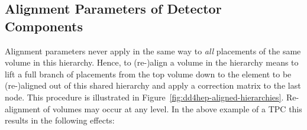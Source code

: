 \documentclass[10pt,a4paper]{article}
\begin{document}
\subsection{Alignment Parameters of Detector Components}
\label{subsect:ddalign-intro-aligments}
\noindent
Alignment parameters never apply in the same way to {\it{all}} placements of the 
same volume in this hierarchy. Hence, to (re-)align a volume in the hierarchy
means to lift a full branch of placements from the top volume down to
the element to be (re-)aligned out of this shared hierarchy and apply
a correction matrix to the last node. This procedure is illustrated in 
Figure~\ref{fig:dd4hep-aligned-hierarchies}. Re-alignment of volumes may occur
at any level. In the above example of a TPC this results in the following effects:
\end{document}
